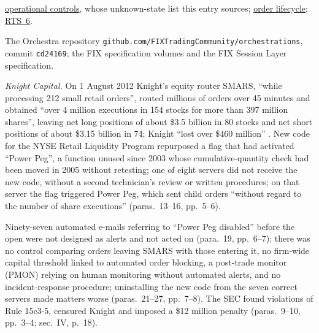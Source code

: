 \begin{qfmechanism}
 \hyperref[meth:automated-trading-operational-controls]{operational controls}, whose unknown-state list this entry sources; \hyperref[mech:order-lifecycle]{order lifecycle}; \hyperref[rule:mifid-rts6-algorithmic-controls]{RTS~6}.

 The Orchestra repository \nolinkurl{github.com/FIXTradingCommunity/orchestrations}, commit \texttt{cd24169}; the FIX specification volumes and the FIX Session Layer specification.

\end{qfmechanism}

\begin{qfevidence}\label{ev:quant-implementation-failures}
 \emph{Knight Capital.} On 1 August 2012 Knight's equity router SMARS, ``while processing 212 small retail orders'', routed millions of orders over 45 minutes and obtained ``over 4 million executions in 154 stocks for more than 397 million shares'', leaving net long positions of about \$3.5 billion in 80 stocks and net short positions of about \$3.15 billion in 74; Knight ``lost over \$460 million'' \citep[para.~1, p.~2]{wide-knight-capital}. New code for the NYSE Retail Liquidity Program repurposed a flag that had activated ``Power Peg'', a function unused since 2003 whose cumulative-quantity check had been moved in 2005 without retesting; one of eight servers did not receive the new code, without a second technician's review or written procedures; on that server the flag triggered Power Peg, which sent child orders ``without regard to the number of share executions'' (paras.~13--16, pp.~5--6).

Ninety-seven automated e-mails referring to ``Power Peg disabled'' before the open were not designed as alerts and not acted on (para.~19, pp.~6--7); there was no control comparing orders leaving SMARS with those entering it, no firm-wide capital threshold linked to automated order blocking, a post-trade monitor (PMON) relying on human monitoring without automated alerts, and no incident-response procedure; uninstalling the new code from the seven correct servers made matters worse (paras.~21--27, pp.~7--8). The SEC found violations of Rule 15c3-5, censured Knight and imposed a \$12 million penalty (paras.~9--10, pp.~3--4; sec.~IV, p.~18).


\end{qfevidence}
